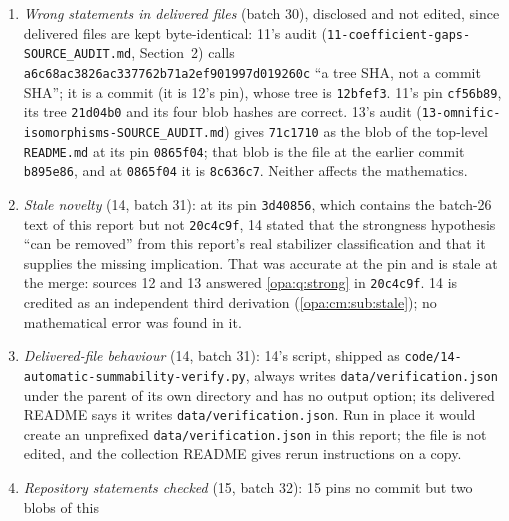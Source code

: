 \documentclass[11pt,oneside]{article}
\numberwithin{equation}{section}
\theoremstyle{definition}
\theoremstyle{remark}
\newcommand{\R}{\mathbb R}
\newcommand{\fn}[1]{\nolinkurl{#1}}
\begin{document}
\begin{enumerate}[itemsep=2pt]
Theorem 5.1 is the strong factorization and that its Corollary 5.2 fixes $\R$ and commutes with
the projections and floor without strongness, and that 10's audit disclaims a classification
of nonstrong automorphisms, is accurate at its pin \texttt{a6c68ac}. 13's statements on
\cref{opa:thm:criterion,opa:thm:factorization} and on the Diophantine reconstruction, and 11's
on the surcomplex Taylor motions and exponent lifts, the Diophantine ideal test, multiplier and
fraction field and the automorphism rigidity of this report, are accurate at their pins. Their
statements that no report proves automatic strongness, scalar detection or coefficient-moving
embeddings are still true at the merge.
\item \emph{Wrong statements in delivered files} (batch 30), disclosed and not edited, since
delivered files are kept byte-identical: 11's audit
(\fn{11-coefficient-gaps-SOURCE_AUDIT.md}, Section~2) calls
\texttt{a6c68ac3826ac337762b71a2ef901997d019260c} ``a tree SHA, not a commit SHA''; it is a
commit (it is 12's pin), whose tree is \texttt{12bfef3}. 11's pin \texttt{cf56b89}, its tree
\texttt{21d04b0} and its four blob hashes are correct. 13's audit
(\fn{13-omnific-isomorphisms-SOURCE_AUDIT.md}) gives \texttt{71c1710} as the blob of the
top-level \fn{README.md} at its pin \texttt{0865f04}; that blob is the file at the earlier
commit \texttt{b895e86}, and at \texttt{0865f04} it is \texttt{8c636c7}. Neither affects the
mathematics.
\item \emph{Stale novelty} (14, batch 31): at its pin \texttt{3d40856}, which contains the batch-26
text of this report but not \texttt{20c4c9f}, 14 stated that the strongness hypothesis ``can be
removed'' from this report's real stabilizer classification and that it supplies the missing
implication. That was accurate at the pin and is stale at the merge: sources 12 and 13 answered
\cref{opa:q:strong} in \texttt{20c4c9f}. 14 is credited as an independent third derivation
(\cref{opa:cm:sub:stale}); no mathematical error was found in it.
\item \emph{Delivered-file behaviour} (14, batch 31): 14's script, shipped as
\fn{code/14-automatic-summability-verify.py}, always writes \fn{data/verification.json} under
the parent of its own directory and has no output option; its delivered README says it writes
\fn{data/verification.json}. Run in place it would create an unprefixed
\fn{data/verification.json} in this report; the file is not edited, and the collection README
gives rerun instructions on a copy.
\item \emph{Repository statements checked} (15, batch 32): 15 pins no commit but two blobs of this

\end{enumerate}
\end{document}
